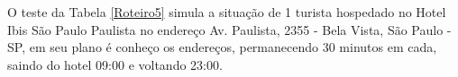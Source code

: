 \begin{center}
	\label{fig:Uninove-Entregador2}
\end{center}

\pagebreak
O teste da Tabela \ref{Roteiro5} simula a situação de 1 turista hospedado no Hotel Ibis São Paulo Paulista no endereço Av. Paulista, 2355 - Bela Vista, São Paulo - SP, em seu plano é conheço os endereços, permanecendo 30 minutos em cada, saindo do hotel 09:00 e voltando 23:00.

